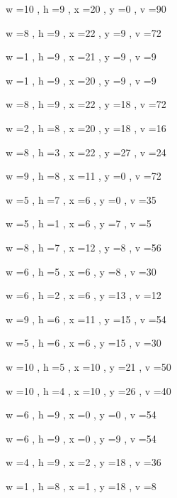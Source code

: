 \documentclass[11pt]{article}
\begin{document}


w =10 , h =9 , x =20 , y =0 , v =90
\par
w =8 , h =9 , x =22 , y =9 , v =72
\par
w =1 , h =9 , x =21 , y =9 , v =9
\par
w =1 , h =9 , x =20 , y =9 , v =9
\par
w =8 , h =9 , x =22 , y =18 , v =72
\par
w =2 , h =8 , x =20 , y =18 , v =16
\par
w =8 , h =3 , x =22 , y =27 , v =24
\par
w =9 , h =8 , x =11 , y =0 , v =72
\par
w =5 , h =7 , x =6 , y =0 , v =35
\par
w =5 , h =1 , x =6 , y =7 , v =5
\par
w =8 , h =7 , x =12 , y =8 , v =56
\par
w =6 , h =5 , x =6 , y =8 , v =30
\par
w =6 , h =2 , x =6 , y =13 , v =12
\par
w =9 , h =6 , x =11 , y =15 , v =54
\par
w =5 , h =6 , x =6 , y =15 , v =30
\par
w =10 , h =5 , x =10 , y =21 , v =50
\par
w =10 , h =4 , x =10 , y =26 , v =40
\par
w =6 , h =9 , x =0 , y =0 , v =54
\par
w =6 , h =9 , x =0 , y =9 , v =54
\par
w =4 , h =9 , x =2 , y =18 , v =36
\par
w =1 , h =8 , x =1 , y =18 , v =8
\par
\newpage
\end{document}
